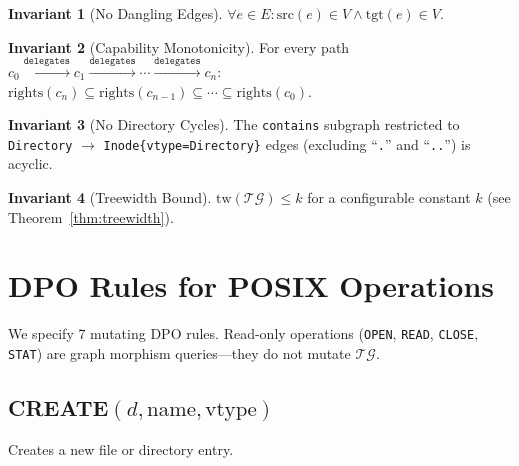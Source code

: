\documentclass[11pt,a4paper]{article}
\theoremstyle{definition}
\newtheorem{invariant}{Invariant}[section]
\newcommand{\TG}{\ensuremath{\mathcal{TG}}}
\newcommand{\tw}{\ensuremath{\mathrm{tw}}}
\begin{document}
\begin{invariant}[No Dangling Edges]\label{inv:nodangle}
$\forall e \in E: \mathrm{src}(e) \in V \land \mathrm{tgt}(e) \in V$.
\end{invariant}

\begin{invariant}[Capability Monotonicity]\label{inv:monotone}
For every path $c_0 \xrightarrow{\texttt{delegates}} c_1 \xrightarrow{\texttt{delegates}} \cdots \xrightarrow{\texttt{delegates}} c_n$: $\mathrm{rights}(c_n) \subseteq \mathrm{rights}(c_{n-1}) \subseteq \cdots \subseteq \mathrm{rights}(c_0)$.
\end{invariant}

\begin{invariant}[No Directory Cycles]\label{inv:nocycle}
The \texttt{contains} subgraph restricted to \texttt{Directory} $\to$ \texttt{Inode\{vtype=Directory\}} edges (excluding ``\texttt{.}'' and ``\texttt{..}'') is acyclic.
\end{invariant}

\begin{invariant}[Treewidth Bound]\label{inv:treewidth}
$\tw(\TG) \le k$ for a configurable constant $k$ (see Theorem~\ref{thm:treewidth}).
\end{invariant}

\section{DPO Rules for POSIX Operations}\label{sec:dpo}

We specify 7 mutating DPO rules. Read-only operations (\texttt{OPEN},
\texttt{READ}, \texttt{CLOSE}, \texttt{STAT}) are graph morphism
queries---they do not mutate \TG{}.

\subsection{CREATE$(d, \mathrm{name}, \mathrm{vtype})$}

Creates a new file or directory entry.
\end{document}
